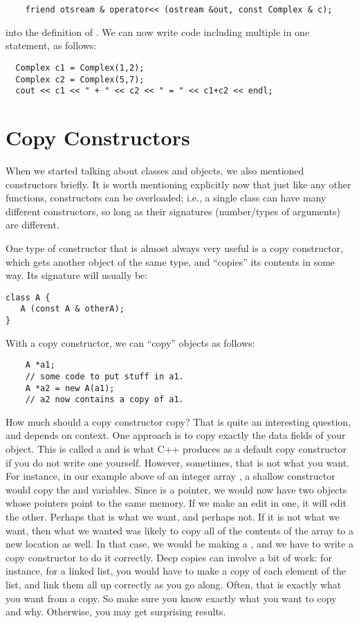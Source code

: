 \begin{verbatim}
    friend otsream & operator<< (ostream &out, const Complex & c); 
\end{verbatim}

into the definition of .
We can now write code including multiple \code{<<} 
in one statement, as follows: 

\begin{verbatim}
  Complex c1 = Complex(1,2);
  Complex c2 = Complex(5,7);
  cout << c1 << " + " << c2 << " = " << c1+c2 << endl;
\end{verbatim}

\section{Copy Constructors}
\label{sec:overloading:copy-constructors}
When we started talking about classes and objects,
we also mentioned constructors briefly.
It is worth mentioning explicitly now that just like any other
functions, constructors can be overloaded; i.e.,
a single class can have many different constructors,
so long as their signatures (number/types of arguments) are different.

One type of constructor that is almost always very useful is a copy
constructor, which gets another object of the same type,
and ``copies'' its contents in some way.
Its signature will usually be:

\begin{verbatim}
class A {
   A (const A & otherA);
}
\end{verbatim}

With a copy constructor, we can ``copy'' objects as follows:

\begin{verbatim}
    A *a1;
    // some code to put stuff in a1.
    A *a2 = new A(a1);
    // a2 now contains a copy of a1.
\end{verbatim}

How much should a copy constructor copy?
That is quite an interesting question, and depends on context. 
One approach is to copy exactly the data fields of your object.
This is called a  and is what C++ produces as a
default copy constructor if you do not write one yourself.
However, sometimes, that is not what you want.
For instance, in our example above of an integer array ,
a shallow constructor would copy the  and  variables.
Since  is a pointer, we would now have two objects whose
 pointers point to the same memory.
If we make an edit in one, it will edit the other.
Perhaps that is what we want, and perhaps not.
If it is not what we want, then what we wanted was likely to copy all
of the contents of the array to a new location as well.
In that case, we would be making a ,
and we have to write a copy constructor to do it correctly.
Deep copies can involve a bit of work:
for instance, for a linked list, you would have to make a copy of
each element of the list, and link them all up correctly as you go along.
Often, that is exactly what you want from a copy.
So make sure you know exactly what you want to copy and why.
Otherwise, you may get surprising results.

